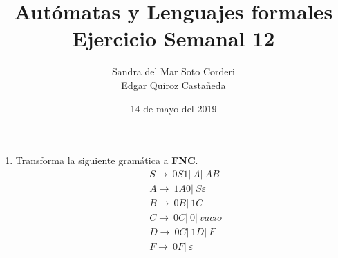 \documentclass{article}
\begin{document}
\title{
    Autómatas y Lenguajes formales \\
    Ejercicio Semanal 12
}

\author{
    Sandra del Mar Soto Corderi \\
    Edgar Quiroz Castañeda
}

\date{
    14 de mayo del 2019
}

\maketitle

\begin{enumerate}
    \item Transforma la siguiente gramática a \textbf{FNC}.
    \begin{align*}
        &S \rightarrow \ 0S1 |\ A |\ AB \\
        &A \rightarrow \ 1A0 |\ S\varepsilon \\
        &B \rightarrow \ 0B |\ 1C \\
        &C \rightarrow \ 0C |\ 0 |\ vacio \\
        &D \rightarrow \ 0C |\ 1D |\ F \\
        &F \rightarrow \ 0F |\ \varepsilon
    \end{align*}
\end{enumerate}
\end{document}
